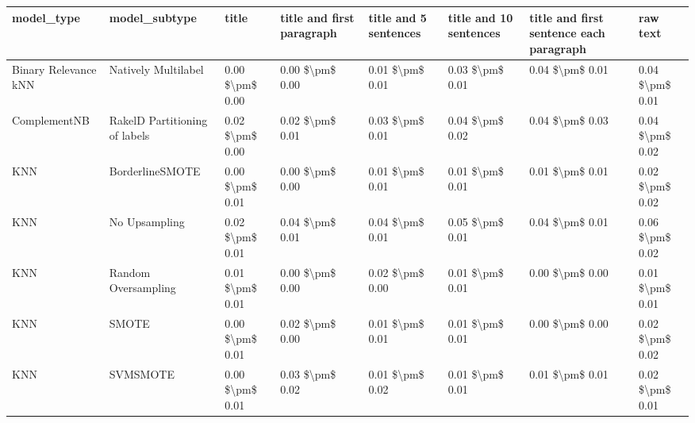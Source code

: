 \begin{tabular}{llllllll}
\toprule
                     model\_type &                 model\_subtype &           title & title and first paragraph & title and 5 sentences & title and 10 sentences & title and first sentence each paragraph &            raw text \\
\midrule
           Binary Relevance kNN &           Natively Multilabel & 0.00 \$\textbackslash pm\$ 0.00 &           0.00 \$\textbackslash pm\$ 0.00 &       0.01 \$\textbackslash pm\$ 0.01 &        0.03 \$\textbackslash pm\$ 0.01 &                         0.04 \$\textbackslash pm\$ 0.01 &     0.04 \$\textbackslash pm\$ 0.01 \\
                   ComplementNB & RakelD Partitioning of labels & 0.02 \$\textbackslash pm\$ 0.00 &           0.02 \$\textbackslash pm\$ 0.01 &       0.03 \$\textbackslash pm\$ 0.01 &        0.04 \$\textbackslash pm\$ 0.02 &                         0.04 \$\textbackslash pm\$ 0.03 &     0.04 \$\textbackslash pm\$ 0.02 \\
                            KNN &               BorderlineSMOTE & 0.00 \$\textbackslash pm\$ 0.01 &           0.00 \$\textbackslash pm\$ 0.00 &       0.01 \$\textbackslash pm\$ 0.01 &        0.01 \$\textbackslash pm\$ 0.01 &                         0.01 \$\textbackslash pm\$ 0.01 &     0.02 \$\textbackslash pm\$ 0.02 \\
                            KNN &                 No Upsampling & 0.02 \$\textbackslash pm\$ 0.01 &           0.04 \$\textbackslash pm\$ 0.01 &       0.04 \$\textbackslash pm\$ 0.01 &        0.05 \$\textbackslash pm\$ 0.01 &                         0.04 \$\textbackslash pm\$ 0.01 &     0.06 \$\textbackslash pm\$ 0.02 \\
                            KNN &           Random Oversampling & 0.01 \$\textbackslash pm\$ 0.01 &           0.00 \$\textbackslash pm\$ 0.00 &       0.02 \$\textbackslash pm\$ 0.00 &        0.01 \$\textbackslash pm\$ 0.01 &                         0.00 \$\textbackslash pm\$ 0.00 &     0.01 \$\textbackslash pm\$ 0.01 \\
                            KNN &                         SMOTE & 0.00 \$\textbackslash pm\$ 0.01 &           0.02 \$\textbackslash pm\$ 0.00 &       0.01 \$\textbackslash pm\$ 0.01 &        0.01 \$\textbackslash pm\$ 0.01 &                         0.00 \$\textbackslash pm\$ 0.00 &     0.02 \$\textbackslash pm\$ 0.02 \\
                            KNN &                      SVMSMOTE & 0.00 \$\textbackslash pm\$ 0.01 &           0.03 \$\textbackslash pm\$ 0.02 &       0.01 \$\textbackslash pm\$ 0.02 &        0.01 \$\textbackslash pm\$ 0.01 &                         0.01 \$\textbackslash pm\$ 0.01 &     0.02 \$\textbackslash pm\$ 0.01 \\

\end{tabular}
